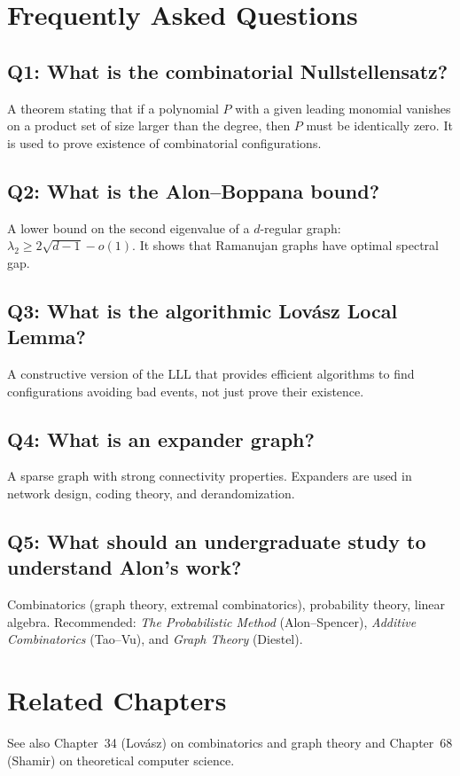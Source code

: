 \section{Frequently Asked Questions}

\subsection*{Q1: What is the combinatorial Nullstellensatz?}
A theorem stating that if a polynomial $P$ with a given leading monomial vanishes on a product set of size larger than the degree, then $P$ must be identically zero. It is used to prove existence of combinatorial configurations.

\subsection*{Q2: What is the Alon--Boppana bound?}
A lower bound on the second eigenvalue of a $d$-regular graph: $\lambda_2 \geq 2\sqrt{d-1} - o(1)$. It shows that Ramanujan graphs have optimal spectral gap.

\subsection*{Q3: What is the algorithmic Lov\'asz Local Lemma?}
A constructive version of the LLL that provides efficient algorithms to find configurations avoiding bad events, not just prove their existence.

\subsection*{Q4: What is an expander graph?}
A sparse graph with strong connectivity properties. Expanders are used in network design, coding theory, and derandomization.

\subsection*{Q5: What should an undergraduate study to understand Alon's work?}
Combinatorics (graph theory, extremal combinatorics), probability theory, linear algebra. Recommended: \textit{The Probabilistic Method} (Alon--Spencer), \textit{Additive Combinatorics} (Tao--Vu), and \textit{Graph Theory} (Diestel).

\section{Related Chapters}
See also Chapter~34 (Lovász) on combinatorics and graph theory and Chapter~68 (Shamir) on theoretical computer science.

